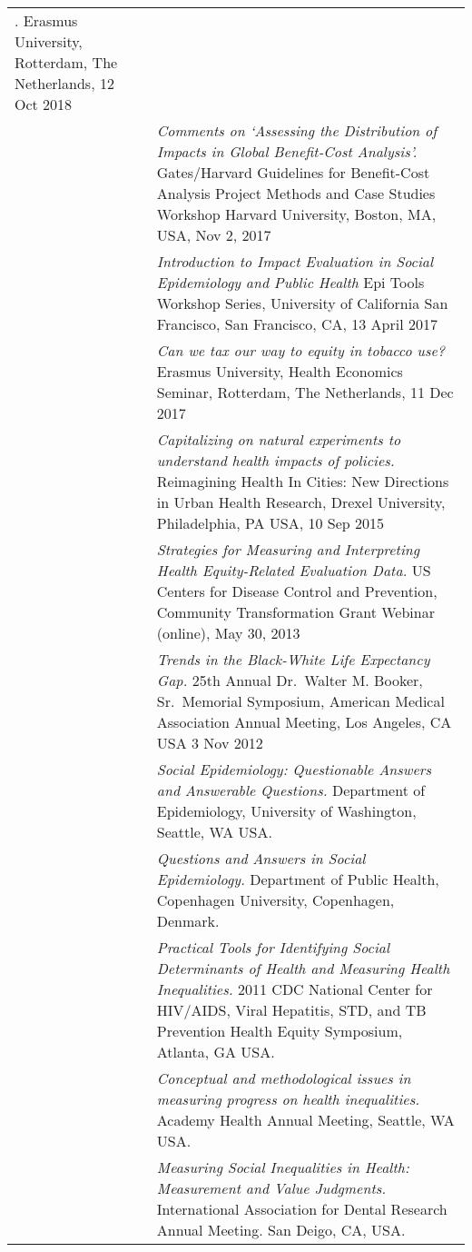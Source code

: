 \documentclass[
  letterpaper,
  DIV=11,
  numbers=noendperiod]{scrartcl}
\begin{document}
\begin{longtable}[]{@{}
  >{\raggedright\arraybackslash}p{}
  >{\raggedright\arraybackslash}p{}@{}}
{inequalities}. Erasmus University, Rotterdam, The Netherlands, 12 Oct
2018 \\
2017 & \emph{Comments on `Assessing the Distribution of Impacts in
Global Benefit-Cost Analysis'.} Gates/Harvard Guidelines for
Benefit-Cost Analysis Project Methods and Case Studies Workshop Harvard
University, Boston, MA, USA, Nov 2, 2017 \\
2017 & \emph{Introduction to Impact Evaluation in Social Epidemiology
and Public Health} Epi Tools Workshop Series, University of California
San Francisco, San Francisco, CA, 13 April 2017 \\
2017 & \emph{Can we tax our way to equity in tobacco use?} Erasmus
University, Health Economics Seminar, Rotterdam, The Netherlands, 11 Dec
2017 \\
2015 & \emph{Capitalizing on natural experiments to understand health
impacts of policies.} Reimagining Health In Cities: New Directions in
Urban Health Research, Drexel University, Philadelphia, PA USA, 10 Sep
2015 \\
2013 & \emph{Strategies for Measuring and Interpreting Health
Equity-Related Evaluation Data.} US Centers for Disease Control and
Prevention, Community Transformation Grant Webinar (online), May 30,
2013 \\
2012 & \emph{Trends in the Black-White Life Expectancy Gap.} 25th Annual
Dr.~Walter M. Booker, Sr.~Memorial Symposium, American Medical
Association Annual Meeting, Los Angeles, CA USA 3 Nov 2012 \\
2012 & \emph{Social Epidemiology: Questionable Answers and Answerable
Questions.} Department of Epidemiology, University of Washington,
Seattle, WA USA. \\
2011 & \emph{Questions and Answers in Social Epidemiology.} Department
of Public Health, Copenhagen University, Copenhagen, Denmark. \\
2011 & \emph{Practical Tools for Identifying Social Determinants of
Health and Measuring Health Inequalities.} 2011 CDC National Center for
HIV/AIDS, Viral Hepatitis, STD, and TB Prevention Health Equity
Symposium, Atlanta, GA USA. \\
2011 & \emph{Conceptual and methodological issues in measuring progress
on health inequalities.} Academy Health Annual Meeting, Seattle, WA
USA. \\
2011 & \emph{Measuring Social Inequalities in Health: Measurement and
Value Judgments.} International Association for Dental Research Annual
Meeting. San Deigo, CA, USA. \\

\end{longtable}
\end{document}
